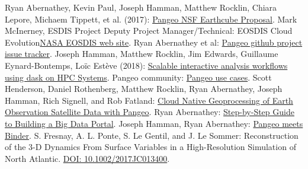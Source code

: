 \documentclass{article}
\begin{document}






\small

\begin{thebibliography}{00}
 Ryan Abernathey, Kevin Paul, Joseph Hamman, Matthew Rocklin, Chiara Lepore, Michaem Tippett, et al. (2017): \href{https://figshare.com/articles/Pangeo_NSF_Earthcube_Proposal/5361094}{Pangeo NSF Earthcube Proposal}.
 Mark McInerney, ESDIS Project Deputy Project Manager/Technical: EOSDIS Cloud Evolution\href{https://earthdata.nasa.gov/about/eosdis-cloud-evolution}{NASA EOSDIS web site}.
 Ryan Abernathey et al: \href{https://github.com/pangeo-data/pangeo/issues}{Pangeo github project issue tracker}.
 Joseph Hamman, Matthew Rocklin, Jim Edwards, Guillaume Eynard-Bontemps, Loïc Estève (2018): \href{https://medium.com/pangeo/dask-jobqueue-d7754e42ca53}{Scalable interactive analysis workflows using dask on HPC Systems}.
 Pangeo community: \href{http://pangeo.io/use_cases/index.html}{Pangeo use cases}.
 Scott Henderson, Daniel Rothenberg, Matthew Rocklin, Ryan Abernathey, Joseph Hamman, Rich Signell, and Rob Fatland: \href{https://medium.com/pangeo/cloud-native-geoprocessing-of-earth-observation-satellite-data-with-pangeo-997692d91ca2}{Cloud Native Geoprocessing of Earth Observation Satellite Data with Pangeo}.
 Ryan Abernathey: \href{https://medium.com/pangeo/step-by-step-guide-to-building-a-big-data-portal-e262af1c2977}{Step-by-Step Guide to Building a Big Data Portal}.
 Joseph Hamman, Ryan Abernathey: \href{https://medium.com/pangeo/pangeo-meets-binder-2ea923feb34f}{Pangeo meets Binder}.
 S. Fresnay, A. L. Ponte, S. Le Gentil, and J. Le Sommer: Reconstruction of the 3-D Dynamics From Surface Variables in
a High-Resolution Simulation of North Atlantic. \href{https://agupubs.onlinelibrary.wiley.com/doi/abs/10.1002/2017JC013400}{DOI: 10.1002/2017JC013400}.
\end{thebibliography}
\end{document}
